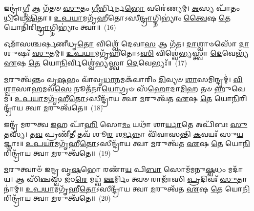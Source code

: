 {\anuvakamend[{𑌮𑌧𑍁᳴\-\ul{𑌸𑍍𑌤𑍍𑌰𑌿}\-\-\ul{𑍞}\-𑌶𑌤𑍍}]}%

𑌇𑌨𑍍𑌦𑍍𑌰𑌾॑\-\ul{𑌗𑍍𑌨𑍀} 𑌆 𑌗᳴𑌤𑍞 \ul{𑌸𑍁}\-𑌤𑌂 \ul{𑌗𑍀}\-𑌰𑍍𑌭𑌿𑌰𑍍𑌨\-\ul{𑌭𑍋} 𑌵𑌰𑍇॑𑌣𑍍𑌯𑌮𑍍। \ul{𑌅}\-𑌸𑍍𑌯 𑌪𑌾᳴𑌤𑌂 \ul{𑌧𑌿}\-𑌯𑍇\-\ul{𑌷𑌿}\-𑌤𑌾॥ \ul{𑌉}\-\-\ul{𑌪}\-\-\ul{𑌯𑌾}\-𑌮𑌗𑍃᳴𑌹𑍀𑌤𑍋\-𑌽𑌸𑍀\-\ul{𑌨𑍍𑌦𑍍𑌰𑌾}\-𑌗𑍍𑌨𑌿\-𑌭𑍍𑌯𑌾𑌂॑ \ul{𑌤𑍍𑌵𑍈}\-𑌷 \ul{𑌤𑍇} 𑌯𑍋𑌨𑌿᳴𑌰𑌿\-\ul{𑌨𑍍𑌦𑍍𑌰𑌾}\-𑌗𑍍𑌨𑌿\-𑌭𑍍𑌯𑌾𑌂॑ 𑌤𑍍𑌵𑌾॥~(16)

{\anuvakamend[{𑌇𑌨𑍍𑌦𑍍𑌰𑌾॑𑌗𑍍𑌨𑍀 𑌵𑌿𑍞\-\ul{𑌶}\-𑌤𑌿𑌃}]}%

𑌓𑌮𑌾᳴𑌸𑌶𑍍𑌚𑌰𑍍\mbox{}𑌷𑌣𑍀𑌧𑍃\-\ul{𑌤𑍋} 𑌵𑌿𑌶𑍍𑌵𑍇᳴ 𑌦𑍇𑌵𑌾\-\ul{𑌸} 𑌆 𑌗᳴𑌤। \ul{𑌦𑌾}\-𑌶𑍍𑌵𑌾𑍞𑌸𑍋᳴ \ul{𑌦𑌾}\-𑌶𑍁𑌷𑌃᳴ \ul{𑌸𑍁}\-𑌤𑌮𑍍॥ \ul{𑌉}\-\-\ul{𑌪}\-\-\ul{𑌯𑌾}\-𑌮𑌗𑍃᳴𑌹𑍀𑌤𑍋\-𑌽\-\ul{𑌸𑌿} 𑌵𑌿𑌶𑍍𑌵𑍇॑𑌭𑍍𑌯𑌸𑍍𑌤𑍍𑌵𑌾 \ul{𑌦𑍇}\-𑌵𑍇𑌭𑍍𑌯᳴ \ul{𑌏}\-𑌷 \ul{𑌤𑍇} 𑌯𑍋\-\ul{𑌨𑌿}\-𑌰𑍍𑌵𑌿𑌶𑍍𑌵𑍇॑𑌭𑍍𑌯𑌸𑍍𑌤𑍍𑌵𑌾 \ul{𑌦𑍇}\-𑌵𑍇𑌭𑍍𑌯𑌃᳴॥~(17)

{\anuvakamend[{𑌇𑌨𑍍𑌦𑍍𑌰𑌾॑\-\ul{𑌗𑍍𑌨𑍀} 𑌓𑌮𑌾᳴𑌸𑍋 𑌵𑌿𑍞\-\ul{𑌶}\-𑌤𑌿𑌰𑍍𑌵𑌿𑍞᳴𑌶𑌤𑌿𑌃}]}%

\-\ul{𑌮}\-𑌰𑍁𑌤𑍍𑌵᳴𑌨𑍍𑌤𑌂 𑌵𑍃\-\ul{𑌷}\-𑌭𑌂 𑌵𑌾᳴𑌵𑍃\-\ul{𑌧𑌾}\-𑌨𑌮𑌕᳴𑌵𑌾𑌰𑌿𑌂 \ul{𑌦𑌿}\-𑌵𑍍𑌯𑍞 \ul{𑌶𑌾}\-𑌸𑌮𑌿𑌨𑍍𑌦𑍍𑌰𑌮𑍍॑। \ul{𑌵𑌿}\-\-\ul{𑌶𑍍𑌵𑌾}\-𑌸𑌾\-\ul{𑌹}\-𑌮𑌵᳴\-\ul{𑌸𑍇} 𑌨𑍂𑌤᳴𑌨𑌾\-\ul{𑌯𑍋}\-𑌗𑍍𑌰𑍞 𑌸᳴\-\ul{𑌹𑍋}\-𑌦𑌾\-\ul{𑌮𑌿}\-𑌹 𑌤𑍞 𑌹𑍁᳴𑌵𑍇𑌮॥ \ul{𑌉}\-\-\ul{𑌪}\-\-\ul{𑌯𑌾}\-𑌮𑌗𑍃᳴𑌹𑍀\-\ul{𑌤𑍋}\-\-𑌽𑌸𑍀𑌨𑍍𑌦𑍍𑌰𑌾᳴𑌯 𑌤𑍍𑌵𑌾 \ul{𑌮}\-𑌰𑍁𑌤𑍍𑌵᳴𑌤 \ul{𑌏}\-𑌷 \ul{𑌤𑍇} 𑌯𑍋\-\ul{𑌨𑌿}\-𑌰𑌿𑌨𑍍𑌦𑍍𑌰𑌾᳴𑌯 𑌤𑍍𑌵𑌾 \ul{𑌮}\-𑌰𑍁𑌤𑍍𑌵᳴𑌤𑍇॥~(18)

{\anuvakamend[{\-\ul{𑌮}\-𑌰𑍁𑌤𑍍𑌵᳴\-\ul{𑌨𑍍𑌤}\-\-\ul{𑍞} 𑌷𑌡𑍍𑌵𑌿𑍞᳴𑌶𑌤𑌿𑌃}]}%

𑌇𑌨𑍍𑌦𑍍𑌰᳴ 𑌮𑌰𑍁𑌤𑍍𑌵 \ul{𑌇}\-𑌹 𑌪𑌾᳴\-\ul{𑌹𑌿} 𑌸𑍋\-\ul{𑌮𑌂} 𑌯𑌥𑌾᳴ 𑌶𑌾\-\ul{𑌰𑍍𑌯𑌾}\-𑌤𑍇 𑌅𑌪𑌿᳴𑌬𑌃 \ul{𑌸𑍁}\-𑌤𑌸𑍍𑌯᳴। 𑌤\-\ul{𑌵} 𑌪𑍍𑌰𑌣𑍀᳴\-\ul{𑌤𑍀} 𑌤𑌵᳴ 𑌶𑍂\-\ul{𑌰} 𑌶\-\ul{𑌰𑍍𑌮}\-𑌨𑍍𑌨𑌾 𑌵𑌿᳴𑌵𑌾𑌸𑌨𑍍𑌤𑌿 \ul{𑌕}\-𑌵𑌯𑌃᳴ 𑌸𑍁\-\ul{𑌯}\-𑌜𑍍𑌞𑌾𑌃॥ \ul{𑌉}\-\-\ul{𑌪}\-\-\ul{𑌯𑌾}\-𑌮𑌗𑍃᳴𑌹𑍀\-\ul{𑌤𑍋}\-\-𑌽𑌸𑍀𑌨𑍍𑌦𑍍𑌰𑌾᳴𑌯 𑌤𑍍𑌵𑌾 \ul{𑌮}\-𑌰𑍁𑌤𑍍𑌵᳴𑌤 \ul{𑌏}\-𑌷 \ul{𑌤𑍇} 𑌯𑍋\-\ul{𑌨𑌿}\-𑌰𑌿𑌨𑍍𑌦𑍍𑌰𑌾᳴𑌯 𑌤𑍍𑌵𑌾 \ul{𑌮}\-𑌰𑍁𑌤𑍍𑌵᳴𑌤𑍇॥~(19)

{\anuvakamend[{𑌇𑌨𑍍𑌦𑍍𑌰𑍈\-\ul{𑌕𑌾}\-𑌨𑍍𑌨\-\ul{𑌤𑍍𑌰𑌿}\-\-\ul{𑍞}\-𑌶𑌤𑍍}]}%

\-\ul{𑌮}\-𑌰𑍁𑌤𑍍𑌵𑌾𑍞᳴ 𑌇𑌨𑍍𑌦𑍍𑌰 𑌵𑍃\-\ul{𑌷}\-𑌭𑍋 𑌰𑌣𑌾᳴\-\ul{𑌯} 𑌪𑌿\-\ul{𑌬𑌾} 𑌸𑍋𑌮᳴𑌮𑌨𑍁\-\ul{𑌷𑍍𑌵}\-𑌧𑌂 𑌮𑌦𑌾᳴𑌯। 𑌆 𑌸𑌿᳴𑌞𑍍𑌚𑌸𑍍𑌵 \ul{𑌜}\-𑌠\-\ul{𑌰𑍇} 𑌮𑌧𑍍𑌵᳴ \ul{𑌊}\-𑌰𑍍𑌮𑌿𑌂 𑌤𑍍𑌵𑍞 𑌰𑌾𑌜𑌾᳴𑌸𑌿 \ul{𑌪𑍍𑌰}\-𑌦𑌿𑌵𑌃᳴ \ul{𑌸𑍁}\-𑌤𑌾𑌨𑌾॑𑌮𑍍॥ \ul{𑌉}\-\-\ul{𑌪}\-\-\ul{𑌯𑌾}\-𑌮𑌗𑍃᳴𑌹𑍀\-\ul{𑌤𑍋}\-\-𑌽𑌸𑍀𑌨𑍍𑌦𑍍𑌰𑌾᳴𑌯 𑌤𑍍𑌵𑌾 \ul{𑌮}\-𑌰𑍁𑌤𑍍𑌵᳴𑌤 \ul{𑌏}\-𑌷 \ul{𑌤𑍇} 𑌯𑍋\-\ul{𑌨𑌿}\-𑌰𑌿𑌨𑍍𑌦𑍍𑌰𑌾᳴𑌯 𑌤𑍍𑌵𑌾 \ul{𑌮}\-𑌰𑍁𑌤𑍍𑌵᳴𑌤𑍇॥~(20)

{\anuvakamend[{𑌇𑌨𑍍𑌦𑍍𑌰᳴ 𑌮𑌰𑍁𑌤𑍍𑌵𑍋 \ul{𑌮}\-𑌰𑍁\-\ul{𑌤𑍍𑌵𑌾}\-𑌨𑍇\-\ul{𑌕𑌾}\-𑌨𑍍𑌨 \ul{𑌤𑍍𑌰𑌿}\-\-\ul{𑍞}\-𑌶𑌦𑍇\-\ul{𑌕𑌾}\-𑌨𑍍𑌨 \ul{𑌤𑍍𑌰𑌿}\-\-\ul{𑍞}\-𑌶𑌤𑍍}]}%

